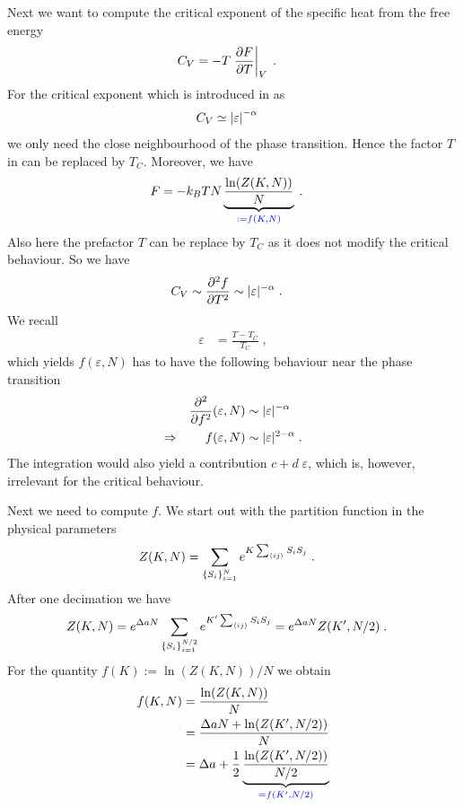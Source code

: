Next we want to compute the critical exponent of the specific heat from the free energy 
%
\begin{align}\label{eq:CV:a}
C_{V} &= -T \eval{\pdv{F}{T}}_{V}\;.
\end{align}
%
For the critical exponent which is introduced in   as
%
\begin{align*}
C_{V}&\simeq  \abs{\varepsilon}^{-\alpha}
\end{align*}
%
we only need the close neighbourhood of the phase transition.
Hence the factor $T$ in  can be replaced by $T_{C}$.
Moreover, we have
%
\begin{align*}
F &= - k_{B} T N \underbrace{
\frac{\ln(Z(K,N))}{N}
}_{\color{blue} := f(K,N)}\;.
\end{align*}
%
Also here the prefactor $T$ can be replace by $T_{C}$ as it does not modify the critical behaviour. So we have
%
\begin{align*}
C_{V} &\sim \pdv[2]{f}{T} \sim |\varepsilon|^{-\alpha}\;.
\end{align*}
%
We recall
%
\begin{align*}
\varepsilon &= \frac{T-T_{C}}{T_{C}}\;,
\end{align*}
%
which yields $f(\varepsilon,N)$ has to have the following behaviour near the phase transition
\begin{align}
\pdv[2]f(\varepsilon,N) &\sim |\varepsilon|^{-\alpha}\nonumber\\
\Rightarrow\qquad f(\varepsilon,N) &\sim |\varepsilon|^{2 -\alpha}\;.
\label{eq:f:epsilon}
\end{align}
%
The integration would also yield a contribution $c + d \;\varepsilon$, which is, however, irrelevant for the critical behaviour.


Next we need to compute $f$.
We start out with the partition function  in the physical parameters 
%
\begin{align*}
Z(K,N) &= \sum_{\{S_{i}\}_{i=1}^{N}} e^{K \sum_{\left\langle ij\right\rangle} S_{i}S_{j}}\;.
\end{align*}
%
After one decimation we have 
%
\begin{align*}
Z(K,N) &= e^{\Delta a N } \sum_{\{S_{i}\}_{i=1}^{N/2}} e^{K' \sum_{\left\langle ij\right\rangle} S_{i}S_{j}}
= e^{\Delta a N } Z(K',N/2)\;.
\end{align*}
%
For the quantity $f(K) := \ln(Z(K,N))/N$ we obtain
%
\begin{align*}
f(K,N) &= \frac{\ln(Z(K,N))}{N} \\
&=\frac{\Delta a N + \ln(Z(K',N/2))}{N}\\
&=\Delta a +  \frac{1}{2} \underbrace{
\frac{\ln(Z(K',N/2))}{N/2}
}_{\color{blue} = f(K',N/2)}
\end{align*}




